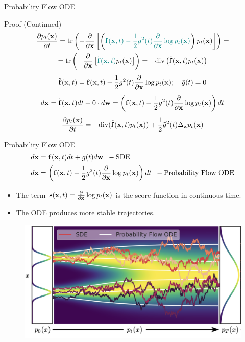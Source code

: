 \documentclass{beamer}
\begin{document}
\begin{frame}{Probability Flow ODE}
	\begin{block}{Proof (Continued)}
 		\vspace{-0.7cm}
 		\begin{multline*}
 			\frac{\partial p_t(\mathbf{x})}{\partial t} =  \text{tr}\left( - \frac{\partial}{\partial \mathbf{x}} \left[ \left( {\color{teal}\mathbf{f}(\mathbf{x}, t) - \frac{1}{2} g^2(t) \frac{\partial}{\partial \mathbf{x}}\log p_t(\mathbf{x})}\right) p_t(\mathbf{x}) \right]  \right) =\\
 			  =  \text{tr}\left( - \frac{\partial}{\partial \mathbf{x}} \left[ {\color{teal}\tilde{\mathbf{f}}(\mathbf{x}, t)} p_t(\mathbf{x}) \right]  \right) = -  \text{div}\left(\tilde{\mathbf{f}}(\mathbf{x}, t) p_t(\mathbf{x})\right) 
 		\end{multline*}
		\[
			\tilde{\mathbf{f}}(\mathbf{x}, t) = \mathbf{f}(\mathbf{x}, t) -\frac{1}{2} g^2(t) \frac{\partial}{\partial \mathbf{x}} \log p_t(\mathbf{x}); \quad \tilde{g}(t) = 0
		\]
	 	\[
	 		d \mathbf{x} = \tilde{\mathbf{f}}(\mathbf{x}, t) dt + 0 \cdot d \mathbf{w} = \left(\mathbf{f}(\mathbf{x}, t) -\frac{1}{2} g^2(t) \frac{\partial}{\partial \mathbf{x}} \log p_t(\mathbf{x}) \right) dt
	 	\]
		\[
			\frac{\partial p_t(\mathbf{x})}{\partial t} = - \text{div}(\tilde{\mathbf{f}}(\mathbf{x}, t) p_t(\mathbf{x})) + \frac{1}{2}\tilde{g}^2(t) \Delta_{\mathbf{x}}p_t(\mathbf{x})
		\]
 	\end{block}
\end{frame}
\begin{frame}{Probability Flow ODE}
	\vspace{-0.5cm}
	\begin{align*}
		d\mathbf{x} &= \mathbf{f}(\mathbf{x}, t) dt + g(t) d \mathbf{w} \;\; - \text{SDE} \\
		d\mathbf{x} &= \left(\mathbf{f}(\mathbf{x}, t) -\frac{1}{2} g^2(t) \frac{\partial}{\partial \mathbf{x}} \log p_t(\mathbf{x}) \right) dt  \;\; - \text{Probability Flow ODE}
	\end{align*}
	\vspace{-0.3cm}
	\begin{itemize}
		\item The term $\mathbf{s}(\mathbf{x}, t) = \frac{\partial}{\partial \mathbf{x}} \log p_t(\mathbf{x})$ is the score function in continuous time.
		\item The ODE produces more stable trajectories.
	\end{itemize}
	\begin{figure}
		\includegraphics[width=0.75\linewidth]{figs/probability_flow}
	\end{figure}
\end{frame}
\end{document}
